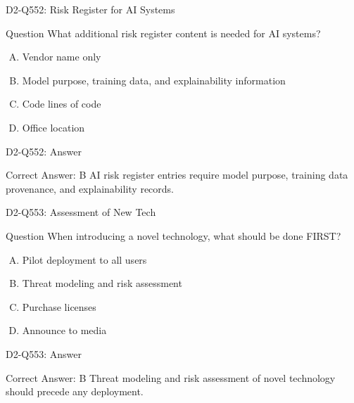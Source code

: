 \documentclass{beamer}
\begin{document}
	\begin{frame}{D2-Q552: Risk Register for AI Systems}
		\begin{block}{Question}
			What additional risk register content is needed for AI systems?
		\end{block}
		\begin{enumerate}[(A)]
			\item Vendor name only
			\item Model purpose, training data, and explainability information
			\item Code lines of code
			\item Office location
		\end{enumerate}
	\end{frame}
	\begin{frame}{D2-Q552: Answer}
		\begin{block}{Correct Answer: B}
			AI risk register entries require model purpose, training data provenance, and explainability records.
		\end{block}
	\end{frame}
	
	\begin{frame}{D2-Q553: Assessment of New Tech}
		\begin{block}{Question}
			When introducing a novel technology, what should be done FIRST?
		\end{block}
		\begin{enumerate}[(A)]
			\item Pilot deployment to all users
			\item Threat modeling and risk assessment
			\item Purchase licenses
			\item Announce to media
		\end{enumerate}
	\end{frame}
	\begin{frame}{D2-Q553: Answer}
		\begin{block}{Correct Answer: B}
			Threat modeling and risk assessment of novel technology should precede any deployment.
		\end{block}
	\end{frame}
	
\end{document}
